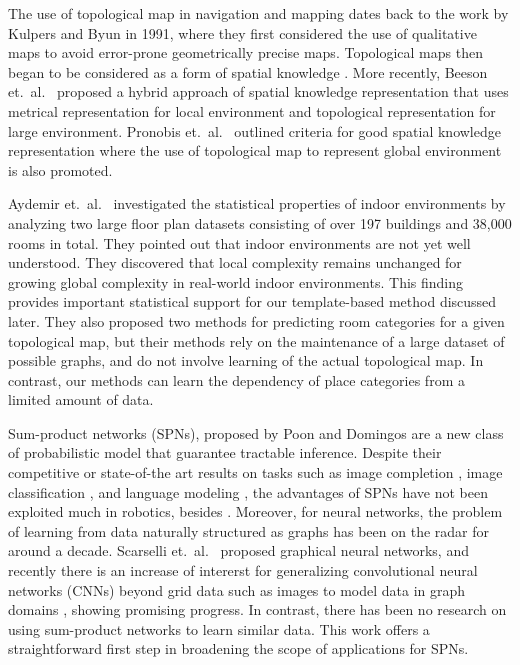 \documentclass[10pt, titlepage]{article}
\theoremstyle{definition}
\begin{document}
The use of topological map in navigation and mapping dates back to the work by Kulpers and Byun \cite{kuipers1991robot} in 1991, where they first considered the use of qualitative maps to avoid error-prone geometrically precise maps. Topological maps then began to be considered as a form of spatial knowledge \cite{kuipers2000spatial}. More recently, Beeson et.~al.~\cite{beeson2010factoring} proposed a hybrid approach of spatial knowledge representation that uses metrical representation for local environment and topological representation for large environment. Pronobis et.~al.~\cite{pronobis2010representing} outlined criteria for good spatial knowledge representation where the use of topological map to represent global environment is also promoted.

Aydemir et.~al.~\cite{aydemir2012can} investigated the statistical properties of indoor environments by analyzing two large floor plan datasets consisting of over 197 buildings and 38,000 rooms in total. They pointed out that indoor environments are not yet well understood. They discovered that local complexity remains unchanged for growing global complexity in real-world indoor environments. This finding provides important statistical support for our template-based method discussed later. They also proposed two methods for predicting room categories for a given topological map, but their methods rely on the maintenance of a large dataset of possible graphs, and do not involve learning of the actual topological map. In contrast, our methods can learn the dependency of place categories from a limited amount of data.

Sum-product networks (SPNs), proposed by Poon and Domingos \cite{poon2011sum} are a new class of probabilistic model that guarantee tractable inference. Despite their competitive or state-of-the art results on tasks such as image completion \cite{poon2011sum}, image classification \cite{gens2012discriminative}, and language modeling \cite{cheng2014language}, the advantages of SPNs have not been exploited much in robotics, besides \cite{pronobis2016learning}. Moreover, for neural networks, the problem of learning from data naturally structured as graphs has been on the radar for around a decade. Scarselli et.~al.~\cite{scarselli2009graph} proposed graphical neural networks, and recently there is an increase of intererst for generalizing convolutional neural networks (CNNs) beyond grid data such as images to model data in graph domains \cite{defferrard2016convolutional}\cite{kipf2016semi}, showing promising progress. In contrast, there has been no research on using sum-product networks to learn similar data. This work offers a straightforward first step in broadening the scope of applications for SPNs.
\end{document}
